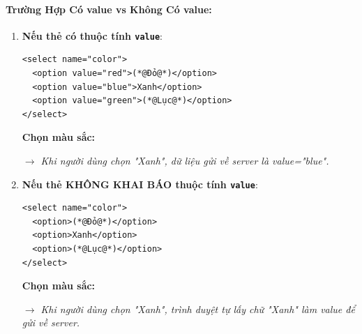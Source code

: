 \documentclass[11pt,oneside]{book}
\newcommand{\codeinline}[1]{\textcolor{accentOrange}{\texttt{#1}}}
\begin{document}
\paragraph{Trường Hợp Có value vs Không Có value:}
\begin{enumerate}[leftmargin=1.5em, itemsep=4pt, parsep=0pt]
    \item \textbf{Nếu thẻ có thuộc tính \codeinline{value}}:
    \begin{codeWindow}
\begin{lstlisting}[language=HTML5]
<select name="color">
  <option value="red">(*@Đỏ@*)</option>
  <option value="blue">Xanh</option>
  <option value="green">(*@Lục@*)</option>
</select>
\end{lstlisting}
    \end{codeWindow}

    \begin{browserWindow}
    \sffamily\small
    \textbf{Chọn màu sắc:} \par\vspace{4pt}
    \tcbox[on line, arc=3pt, colback=white, colframe=primaryBlue!50, boxsep=3pt, left=8pt, right=20pt, top=3pt, bottom=3pt]{%
      \small \textcolor{black}{Xanh} \;\; \textcolor{primaryBlue}{\textbf{$\boldsymbol{\vee}$}}%
    } \par\vspace{4pt}
    \textcolor{codeComment}{\small\textit{$\rightarrow$ Khi người dùng chọn "Xanh", dữ liệu gửi về server là value="blue".}}
    \end{browserWindow}

    \item \textbf{Nếu thẻ KHÔNG KHAI BÁO thuộc tính \codeinline{value}}:
    \begin{codeWindow}
\begin{lstlisting}[language=HTML5]
<select name="color">
  <option>(*@Đỏ@*)</option>
  <option>Xanh</option>
  <option>(*@Lục@*)</option>
</select>
\end{lstlisting}
    \end{codeWindow}

    \begin{browserWindow}
    \sffamily\small
    \textbf{Chọn màu sắc:} \par\vspace{4pt}
    \tcbox[on line, arc=3pt, colback=white, colframe=primaryBlue!50, boxsep=3pt, left=8pt, right=20pt, top=3pt, bottom=3pt]{%
      \small \textcolor{black}{Xanh} \;\; \textcolor{primaryBlue}{\textbf{$\boldsymbol{\vee}$}}%
    } \par\vspace{4pt}
    \textcolor{codeComment}{\small\textit{$\rightarrow$ Khi người dùng chọn "Xanh", trình duyệt tự lấy chữ "Xanh" làm value để gửi về server.}}
    \end{browserWindow}
\end{enumerate}
\end{document}
